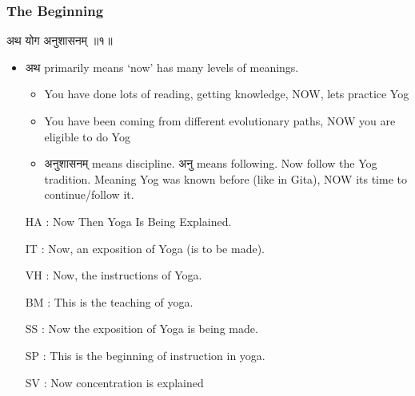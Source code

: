 \begin{frame}[fragile]\frametitle{The Beginning}

\begin{sanskrit}
अथ योग अनुशासनम् ॥१॥
\end{sanskrit}


	\begin{itemize}
	\item अथ primarily means `now' has many levels of meanings.
		\begin{itemize}
		\item You have done lots of reading, getting knowledge, NOW, lets practice Yog
		\item You have been coming from different evolutionary paths, NOW you are eligible to do Yog
		\item अनुशासनम् means discipline. अनु means following. Now follow the Yog tradition. Meaning Yog was known before (like in Gita), NOW its time to continue/follow it.
		\end{itemize}	
	\item [HA]: Now Then Yoga Is Being Explained.
	\item [IT]: Now, an exposition of Yoga (is to be made).
	\item [VH]: Now, the instructions of Yoga.
	\item [BM]: This is the teaching of yoga.
	\item [SS]: Now the exposition of Yoga is being made.
	\item [SP]: This is the beginning of instruction in yoga.
	\item [SV]: Now concentration is explained
	\end{itemize}

\end{frame}



